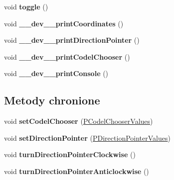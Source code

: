 \begin{CompactItemize}
\item 
\hypertarget{classPCodePointer_5b34ab0f6bb3ddb3bd7e44a7d9a613ca}{
void \textbf{toggle} ()}
\label{classPCodePointer_5b34ab0f6bb3ddb3bd7e44a7d9a613ca}

\item 
\hypertarget{classPCodePointer_ce0986ca3dc000a06a0155d20cd83d26}{
void \textbf{\_\-\_\-dev\_\-\_\-printCoordinates} ()}
\label{classPCodePointer_ce0986ca3dc000a06a0155d20cd83d26}

\item 
\hypertarget{classPCodePointer_103c79ebd3257261d5c72322bc4eb742}{
void \textbf{\_\-\_\-dev\_\-\_\-printDirectionPointer} ()}
\label{classPCodePointer_103c79ebd3257261d5c72322bc4eb742}

\item 
\hypertarget{classPCodePointer_21810c2cdb66ea83cabafde33e8a0206}{
void \textbf{\_\-\_\-dev\_\-\_\-printCodelChooser} ()}
\label{classPCodePointer_21810c2cdb66ea83cabafde33e8a0206}

\item 
\hypertarget{classPCodePointer_fe765c0487ab59dbbbdd47b78842bbcb}{
void \textbf{\_\-\_\-dev\_\-\_\-printConsole} ()}
\label{classPCodePointer_fe765c0487ab59dbbbdd47b78842bbcb}

\end{CompactItemize}
\subsection*{Metody chronione}
\begin{CompactItemize}
\item 
\hypertarget{classPCodePointer_b5c13bf294dddd672ca9fe7675eb258b}{
void \textbf{setCodelChooser} (\hyperlink{penums_8h_59dc57d526e2ce263bdf851c0d4fef3e}{PCodelChooserValues})}
\label{classPCodePointer_b5c13bf294dddd672ca9fe7675eb258b}

\item 
\hypertarget{classPCodePointer_0b97bd6b4383e976e54c5738178c7815}{
void \textbf{setDirectionPointer} (\hyperlink{penums_8h_6d3256570150238c718cbbb5f81c82df}{PDirectionPointerValues})}
\label{classPCodePointer_0b97bd6b4383e976e54c5738178c7815}

\item 
\hypertarget{classPCodePointer_a3ad29e6327d54faf0b081892e720aca}{
void \textbf{turnDirectionPointerClockwise} ()}
\label{classPCodePointer_a3ad29e6327d54faf0b081892e720aca}

\item 
\hypertarget{classPCodePointer_3f43e8205a0554bf7baa3821e01ab4a2}{
void \textbf{turnDirectionPointerAnticlockwise} ()}
\label{classPCodePointer_3f43e8205a0554bf7baa3821e01ab4a2}

\end{CompactItemize}
